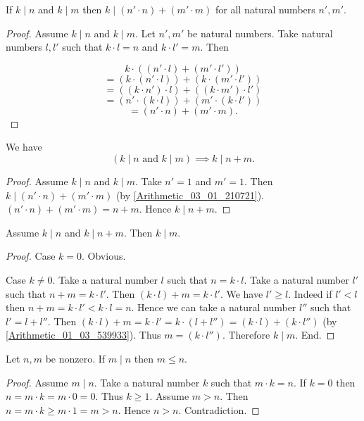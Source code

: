 \documentclass[../../arithmetic.ftl.tex]{subfiles}
\begin{document}
\begin{forthel}
    \begin{proposition}\label{Arithmetic_03_01_210721}
      If $k \mid n$ and $k \mid m$ then $k \mid (n' \cdot n) + (m' \cdot m)$ for all natural numbers $n',m'$.
    \end{proposition}
    \begin{proof}
      Assume $k \mid n$ and $k \mid m$.
      Let $n',m'$ be natural numbers.
      Take natural numbers $l,l'$ such that $k \cdot l = n$ and $k \cdot l' = m$.
      Then

      \[   k \cdot ((n' \cdot l) + (m' \cdot l')) \]
      \[ = (k \cdot (n' \cdot l)) + (k \cdot (m' \cdot l')) \]
      \[ = ((k \cdot n') \cdot l) + ((k \cdot m') \cdot l') \]
      \[ = (n' \cdot (k \cdot l)) + (m' \cdot (k \cdot l')) \]
      \[ = (n' \cdot n) + (m' \cdot m). \]
    \end{proof}

    \begin{corollary}\label{Arithmetic_03_01_655411}
      We have \[ (\text{$k \mid n$ and $k \mid m$}) \implies k \mid n + m. \]
    \end{corollary}
    \begin{proof}
      Assume $k \mid n$ and $k \mid m$.
      Take $n' = 1$ and $m' = 1$.
      Then $k \mid (n' \cdot n) + (m' \cdot m)$ (by \ref{Arithmetic_03_01_210721}).
      $(n' \cdot n) + (m' \cdot m) = n + m$.
      Hence $k \mid n + m$.
    \end{proof}

    \begin{proposition}\label{Arithmetic_03_01_695362}
      Assume $k \mid n$ and $k \mid n + m$.
      Then $k \mid m$.
    \end{proposition}
    \begin{proof}
      Case $k = 0$. Obvious.

      Case $k \neq 0$.
        Take a natural number $l$ such that $n = k \cdot l$.
        Take a natural number $l'$ such that $n + m = k \cdot l'$.
        Then $(k \cdot l) + m = k \cdot l'$.
        We have $l' \geq l$.
        Indeed if $l' < l$ then $n + m = k \cdot l' < k \cdot l = n$.
        Hence we can take a natural number $l''$ such that $l' = l + l''$.
        Then $(k \cdot l) + m = k \cdot l' = k \cdot (l + l'') = (k \cdot l) + (k \cdot l'')$ (by \ref{Arithmetic_01_03_539933}).
        Thus $m = (k \cdot l'')$.
        Therefore $k \mid m$.
      End.
    \end{proof}

    \begin{proposition}\label{Arithmetic_03_01_376821}
      Let $n,m$ be nonzero.
      If $m \mid n$ then $m \leq n$.
    \end{proposition}
    \begin{proof}
      Assume $m \mid n$.
      Take a natural number $k$ such that $m \cdot k = n$.
      If $k = 0$ then $n = m \cdot k = m \cdot 0 = 0$.
      Thus $k \geq 1$.
      Assume $m > n$.
      Then $n = m \cdot k \geq m \cdot 1 = m > n$.
      Hence $n > n$.
      Contradiction.
    \end{proof}


\end{forthel}
\end{document}
